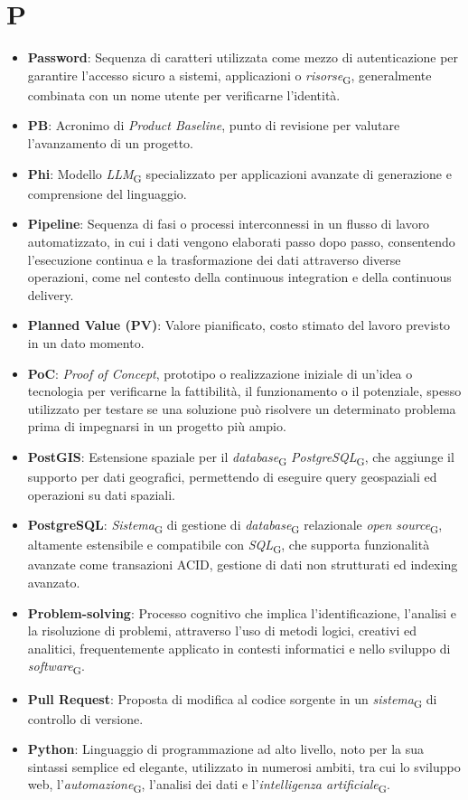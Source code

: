 \section{P}
\begin{itemize}
    \item \textbf{Password}: Sequenza di caratteri utilizzata come mezzo di autenticazione per garantire l'accesso sicuro a sistemi, applicazioni o \textit{risorse}\textsubscript{G}, generalmente combinata con un nome utente per verificarne l'identità.
    \item \textbf{PB}: Acronimo di \textit{Product Baseline}, punto di revisione per valutare l'avanzamento di un progetto.
    \item \textbf{Phi}: Modello \textit{LLM}\textsubscript{G} specializzato per applicazioni avanzate di generazione e comprensione del linguaggio.
    \item \textbf{Pipeline}: Sequenza di fasi o processi interconnessi in un flusso di lavoro automatizzato, in cui i dati vengono elaborati passo dopo passo, consentendo l'esecuzione continua e la trasformazione dei dati attraverso diverse operazioni, come nel contesto della continuous integration e della continuous delivery.
    \item \textbf{Planned Value (PV)}: Valore pianificato, costo stimato del lavoro previsto in un dato momento.
    \item \textbf{PoC}: \textit{Proof of Concept}, prototipo o realizzazione iniziale di un'idea o tecnologia per verificarne la fattibilità, il funzionamento o il potenziale, spesso utilizzato per testare se una soluzione può risolvere un determinato problema prima di impegnarsi in un progetto più ampio.
    \item \textbf{PostGIS}: Estensione spaziale per il \textit{database}\textsubscript{G} \textit{PostgreSQL}\textsubscript{G}, che aggiunge il supporto per dati geografici, permettendo di eseguire query geospaziali ed operazioni su dati spaziali.
    \item \textbf{PostgreSQL}: \textit{Sistema}\textsubscript{G} di gestione di \textit{database}\textsubscript{G} relazionale \textit{open source}\textsubscript{G}, altamente estensibile e compatibile con \textit{SQL}\textsubscript{G}, che supporta funzionalità avanzate come transazioni ACID, gestione di dati non strutturati ed indexing avanzato.
    \item \textbf{Problem-solving}: Processo cognitivo che implica l'identificazione, l'analisi e la risoluzione di problemi, attraverso l'uso di metodi logici, creativi ed analitici, frequentemente applicato in contesti informatici e nello sviluppo di \textit{software}\textsubscript{G}.
    \item \textbf{Pull Request}: Proposta di modifica al codice sorgente in un \textit{sistema}\textsubscript{G} di controllo di versione.
    \item \textbf{Python}: Linguaggio di programmazione ad alto livello, noto per la sua sintassi semplice ed elegante, utilizzato in numerosi ambiti, tra cui lo sviluppo web, l'\textit{automazione}\textsubscript{G}, l'analisi dei dati e l'\textit{intelligenza artificiale}\textsubscript{G}.
\end{itemize}

